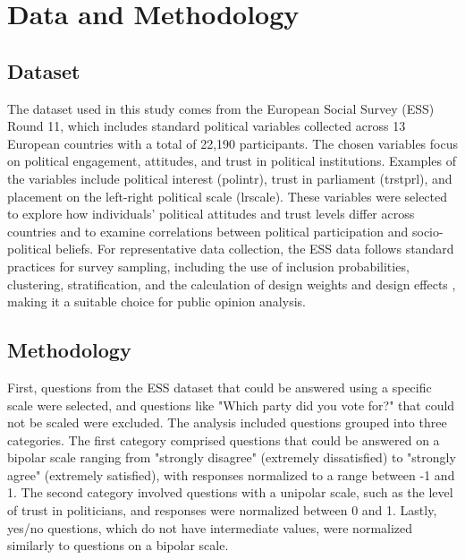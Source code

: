 \section*{Data and Methodology}

\subsection*{Dataset}

The dataset used in this study comes from the European Social Survey (ESS) Round 11, which includes standard political variables collected across 13 European countries with a total of 22,190 participants. The chosen variables focus on political engagement, attitudes, and trust in political institutions. Examples of the variables include political interest (polintr), trust in parliament (trstprl), and placement on the left-right political scale (lrscale). These variables were selected to explore how individuals' political attitudes and trust levels differ across countries and to examine correlations between political participation and socio-political beliefs. For representative data collection, the ESS data follows standard practices for survey sampling, including the use of inclusion probabilities, clustering, stratification, and the calculation of design weights and design effects \cite{jowell2007measuring, lynn2004methods}, making it a suitable choice for public opinion analysis.

\subsection*{Methodology}

First, questions from the ESS dataset that could be answered using a specific scale were selected, and questions like "Which party did you vote for?" that could not be scaled were excluded. The analysis included questions grouped into three categories. The first category comprised questions that could be answered on a bipolar scale ranging from "strongly disagree" (extremely dissatisfied) to "strongly agree" (extremely satisfied), with responses normalized to a range between -1 and 1. The second category involved questions with a unipolar scale, such as the level of trust in politicians, and responses were normalized between 0 and 1. Lastly, yes/no questions, which do not have intermediate values, were normalized similarly to questions on a bipolar scale.

